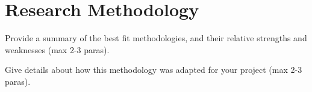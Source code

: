 
\section{Research Methodology}
\label{sec:methodology}

 Provide a summary of the best fit methodologies, and their relative strengths and weaknesses (max 2-3 paras).

 Give details about how this methodology was adapted for your project (max 2-3 paras).




